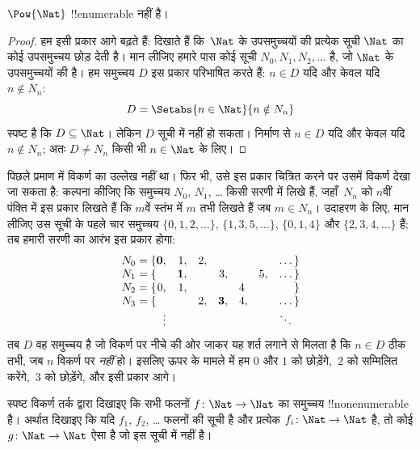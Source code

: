 \documentclass[../../../include/open-logic-section]{subfiles}
\begin{document}
\begin{thm}
$\Pow{\Nat}$ !!{enumerable} नहीं है।
\end{thm}

\begin{proof}
हम इसी प्रकार आगे बढ़ते हैं: दिखाते हैं कि~$\Nat$ के उपसमुच्चयों की प्रत्येक
सूची $\Nat$ का कोई उपसमुच्चय छोड़ देती है। मान लीजिए हमारे पास कोई सूची
$N_0, N_1, N_2, \ldots$ है, जो $\Nat$ के उपसमुच्चयों की है। हम समुच्चय $D$ इस
प्रकार परिभाषित करते हैं: $n \in D$ यदि और केवल यदि $n \notin N_{n}$:
\[
D = \Setabs{n \in \Nat}{n \notin N_n}
\]
स्पष्ट है कि $D\subseteq \Nat$। लेकिन $D$ सूची में नहीं हो सकता। निर्माण
से $n \in D$ यदि और केवल यदि $n\notin N_n$; अतः $D \neq N_n$ किसी भी
$n \in \Nat$ के लिए।
\end{proof}

\begin{explain}
पिछले प्रमाण में विकर्ण का उल्लेख नहीं था। फिर भी, उसे इस प्रकार चित्रित
करने पर उसमें विकर्ण देखा जा सकता है: कल्पना कीजिए कि समुच्चय $N_0$, $N_1$,
\dots{} किसी सरणी में लिखे हैं, जहाँ~$N_n$ को $n$वीं पंक्ति में इस प्रकार
लिखते हैं कि $m$वें स्तंभ में $m$ तभी लिखते हैं जब $m \in N_n$। उदाहरण के
लिए, मान लीजिए उस सूची के पहले चार समुच्चय $\{0,1,2,\dots\}$,
$\{1, 3, 5, \dots\}$, $\{0,1,4\}$ और $\{2,3,4,\dots\}$ हैं; तब हमारी सरणी
का आरंभ इस प्रकार होगा:
\[
\begin{array}{r@{}rrrrrrr}
  N_0 = \{ & \mathbf{0}, & 1, & 2, & & & & \dots\}\\
  N_1 = \{ &  & \mathbf{1}, &  & 3, &  & 5, & \dots\}\\
  N_2 = \{ & 0, & 1, &  &  & 4\phantom{,} &  & \}\\
  N_3 = \{ &  &  & 2, & \mathbf{3}, & 4, & & \dots\}\\
  &\vdots & & & & & & \ddots\phantom{\}}
  \end{array}
\]
तब $D$ वह समुच्चय है जो विकर्ण पर नीचे की ओर जाकर यह शर्त लगाने से मिलता
है कि $n
\in D$ ठीक तभी, जब $n$ विकर्ण पर \emph{नहीं} हो। इसलिए ऊपर के मामले में हम $0$ और
$1$ को छोड़ेंगे,~$2$ को सम्मिलित करेंगे,~$3$ को छोड़ेंगे, और इसी प्रकार आगे।
\end{explain}

\begin{prob}
स्पष्ट विकर्ण तर्क द्वारा दिखाइए कि सभी फलनों $f \colon \Nat \to \Nat$ का
समुच्चय !!{nonenumerable} है। अर्थात दिखाइए कि यदि $f_1$, $f_2$, \dots{}
फलनों की सूची है और प्रत्येक $f_i\colon
\Nat \to \Nat$ है, तो कोई $g \colon \Nat \to
\Nat$ ऐसा है जो इस सूची में नहीं है।
\end{prob}
\end{document}
